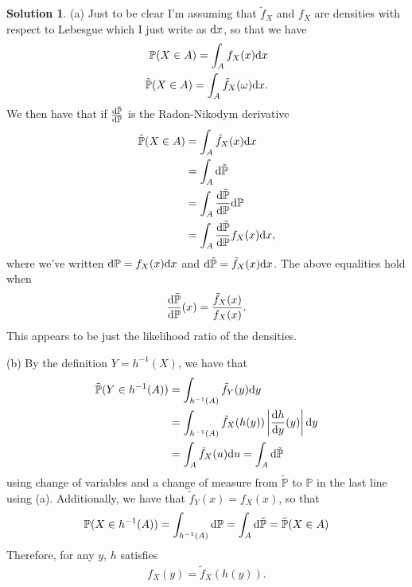 \documentclass[12pt]{article}
\newcommand{\Prob}{\mathbb{P}}
\newcommand{\abs}[1]{ \left| #1 \right| }
\theoremstyle{definition}
\newtheorem{sol}{Solution}
\theoremstyle{remark}
\def\d{{\rm d}}
\begin{document}
\begin{sol}
    (a) Just to be clear I'm assuming that $\tilde{f}_{X}$ and $f_{X}$ are densities with respect to Lebesgue which I just write as $\d x$, so that we have
\begin{align*}
    \Prob( X \in A ) = \int_{A} f_{X}(x) \d x \\
    \tilde{\Prob}(X \in A) = \int_{A} \tilde{f}_{X}(\omega) \d x.
\end{align*}
We then have that if $ \frac{\d \tilde{\Prob}}{\d \Prob}$ is the Radon-Nikodym derivative
\begin{align*}
    \tilde{\Prob}( X \in A ) &= \int_{A} \tilde{f}_{X}(x) \d x  \\
                             &= \int_{A} \d \tilde{\Prob}  \\
                             &= \int_{A}  \frac{\d \tilde{\Prob}}{\d \Prob} \d \Prob \\
                             &= \int_{A} \frac{\d \tilde{\Prob}}{\d \Prob} f_{X}(x) \d x,
\end{align*}
where we've written $\d \Prob = f_{X}(x) \d x$ and $\d \tilde{\Prob} = \tilde{f}_{X}(x) \d x$. The above equalities hold when 
\begin{align*}
    \frac{\d \tilde{\Prob}}{\d \Prob}(x) = \frac{\tilde{f}_{X}(x)}{f_{X}(x)}.
\end{align*}
This appears to be just the likelihood ratio of the densities.

(b) By the definition $Y = h^{-1}(X)$, we have that
\begin{align*}
    \tilde{\Prob}(Y \in h^{-1}(A)) &= \int_{h^{-1}(A)} \tilde{f}_{Y}(y) \d y\\
                                   &= \int_{h^{-1}(A)} \tilde{f}_{X}(h(y)) \abs{\frac{\d h}{ \d y}(y)} \d y\\
                                   &= \int_{A} \tilde{f}_{X}(u) \d u = \int_{A} \d \tilde{\Prob}\\
\end{align*}
using change of variables and a change of measure from $\tilde{\Prob}$ to $\Prob$ in the last line using (a). Additionally, we have that $\tilde{f}_{Y}(x) = f_{X}(x)$, so that
\begin{align*}
\Prob(X \in h^{-1}(A)) = \int_{h^{-1}(A)} \d \Prob = \int_{A} \d \tilde{\Prob}  = \tilde{\Prob}(X \in A)\end{align*}
Therefore, for any $y$, $h$ satisfies
\begin{align*}
    f_{X}(y) = \tilde{f}_{X}(h(y)).
\end{align*}


\end{sol}
\end{document}
